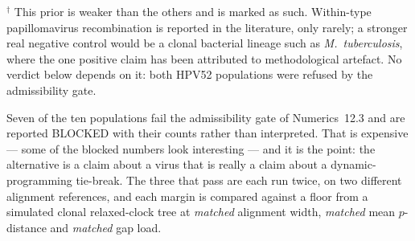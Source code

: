 \noindent$^\dagger$ This prior is weaker than the others and is marked as such.
Within-type papillomavirus recombination is reported in the literature, only
rarely; a stronger real negative control would be a clonal bacterial lineage such
as \emph{M.\ tuberculosis}, where the one positive claim has been attributed to
methodological artefact. No verdict below depends on it: both HPV52 populations
were refused by the admissibility gate.

Seven of the ten populations fail the admissibility gate of
Numerics~12.3 and are reported BLOCKED with their counts rather than
interpreted. That is expensive --- some of the blocked numbers look interesting
--- and it is the point: the alternative is a claim about a virus that is really
a claim about a dynamic-programming tie-break. The three that pass are each run
twice, on two different alignment references, and each margin is compared
against a floor from a simulated clonal relaxed-clock tree at \emph{matched}
alignment width, \emph{matched} mean $p$-distance and \emph{matched} gap load.

